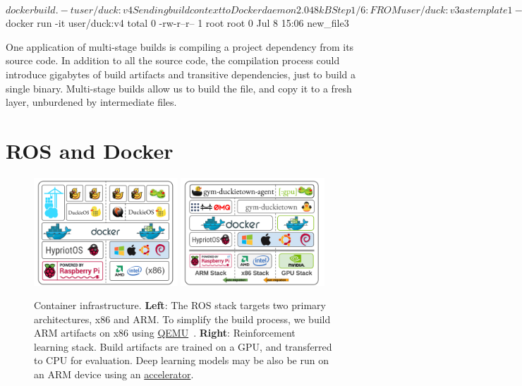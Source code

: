 \begin{pclisting}
~$ docker build . -t user/duck:v4
Sending build context to Docker daemon  2.048kB
Step 1/6 : FROM user/duck:v3 as template1
--- e3b75ef8ecc4
Step 2/6 : FROM daphne/duck as template2
--- ea2f90g8de9e
Step 3/6 : COPY --from=template1 new_file1 new_file2
---> 72b96668378e
Step 4/6 : FROM donald/duck:v3 as template3
---> e3b75ef8ecc4
Step 5/6 : COPY --from=template2 new_file2 new_file3
---> cb1b84277228
Step 6/6 : CMD ls
---> Running in cb1b84277228
Removing intermediate container cb1b84277228
---> c7dc5dd63e77
Successfully built c7dc5dd63e77
Successfully tagged user/duck:v4
~$ docker run -it user/duck:v4
total 0
-rw-r--r-- 1 root root 0 Jul  8 15:06 new_file3
\end{pclisting}
%
One application of multi-stage builds is compiling a project dependency from its source code. In addition to all the source code, the compilation process could introduce gigabytes of build artifacts and transitive dependencies, just to build a single binary. Multi-stage builds allow us to build the file, and copy it to a fresh layer, unburdened by intermediate files.

\section{ROS and Docker}\label{sec:ros-docker}

\begin{figure}[ht]
\centering
\includegraphics[width=0.48\textwidth]{../figures/docker_stack_1.png}
\includegraphics[width=0.48\textwidth]{../figures/docker_stack_2.png}
\caption{Container infrastructure. \textbf{Left}: The ROS stack targets two primary architectures, x86 and ARM. To simplify the build process, we build ARM artifacts on x86 using \href{https://www.qemu.org}{QEMU}~\citep{bellard2005qemu}. \textbf{Right}: Reinforcement learning stack. Build artifacts are trained on a GPU, and transferred to CPU for evaluation. Deep learning models may be also be run on an ARM device using an \href{https://software.intel.com/en-us/neural-compute-stick}{accelerator}.}
\label{fig:docker}
\end{figure}

